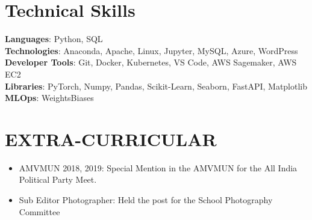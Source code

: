 \documentclass[letterpaper,11pt]{article}
\newcommand{\achievementItem}[1]{
  \item\small{
    {#1 \vspace{-6pt}}
  }
}
\begin{document}
 
\section{Technical Skills}
 \begin{itemize}[leftmargin=0.15in, label={}]
    \small{\item{
     \textbf{Languages}{: Python, SQL} \\
     \vspace{1pt}
     \textbf{Technologies}{: Anaconda, Apache, Linux, Jupyter, MySQL, Azure, WordPress} \\
     \vspace{1pt}
     \textbf{Developer Tools}{: Git, Docker, Kubernetes, VS Code, AWS Sagemaker, AWS EC2} \\
     \vspace{1pt}
     \textbf{Libraries}{: PyTorch, Numpy, Pandas, Scikit-Learn, Seaborn, FastAPI, Matplotlib} \\
     \vspace{1pt}
     \textbf{MLOps}{: WeightsBiases} \\
    }}
 \end{itemize}

\section{EXTRA-CURRICULAR}

\begin{itemize}[leftmargin=0.2in]

  \achievementItem{AMVMUN 2018, 2019: Special Mention in the AMVMUN for the All India Political Party Meet.}
  \achievementItem{Sub Editor Photographer: Held the post for the School Photography Committee}

\end{itemize}
\end{document}
